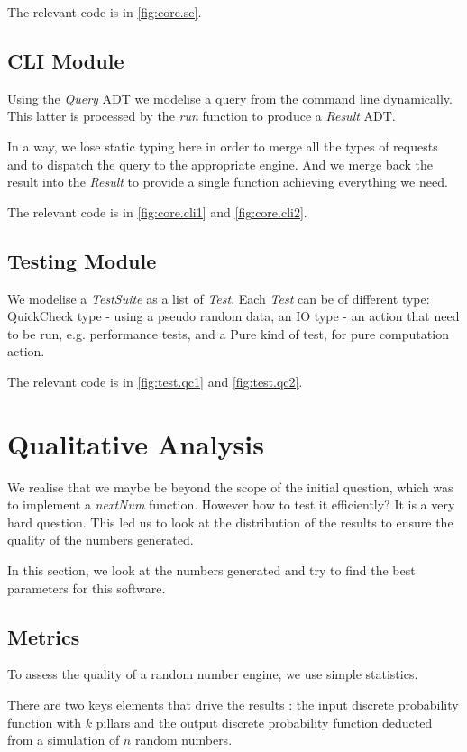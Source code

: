 \documentclass[12pt,a4paper,titlepage]{article}
\begin{document}
The relevant code is in \autoref{fig:core.se}.
\subsection{CLI Module}
Using the \emph{Query} ADT we modelise a query from the command line
dynamically. This latter is processed by the \emph{run} function to 
produce a  \emph{Result} ADT.

In a way, we lose static typing here in order to merge all the types of 
requests and to dispatch the query to the appropriate engine. And we merge
back the result into the \emph{Result} to provide a single function achieving
everything we need.

The relevant code is in \autoref{fig:core.cli1} and \autoref{fig:core.cli2}.
\subsection{Testing Module}
We modelise a \emph{TestSuite} as a list of \emph{Test}.
Each \emph{Test} can be of different type: QuickCheck type - 
using a pseudo random data, 
an IO type - an action that need to be run, e.g. performance tests, 
and a Pure kind of test, for pure computation action.

The relevant code is in \autoref{fig:test.qc1} and \autoref{fig:test.qc2}.
\section{Qualitative Analysis}
\label{sec:quality}
We realise that we maybe be beyond the scope of the initial
question, which was to implement a \emph{nextNum} function.
However how to test it efficiently? It is a very hard question.
This led us to look at the distribution of the results to ensure
the quality of the numbers generated.

In this section, we look at the numbers generated and try
to find the best parameters for this software.

\subsection{Metrics}
To assess the quality of a random number engine, we use
simple statistics. 

There are two keys elements that drive the results :
the input discrete probability function with $k$ pillars and
the output discrete probability function deducted from a
simulation of $n$ random numbers.
\end{document}

